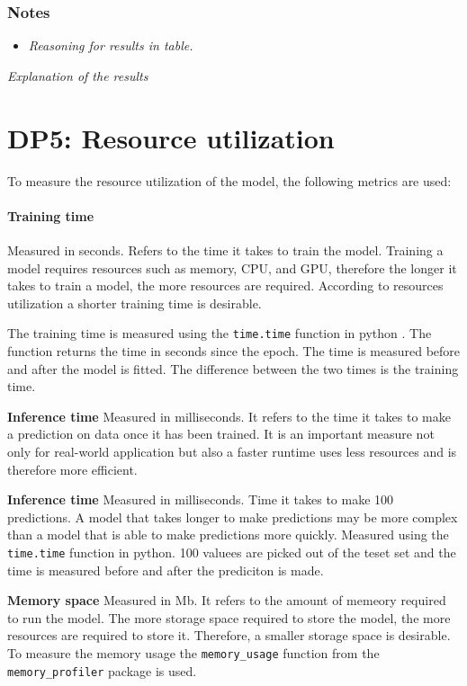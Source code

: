 \subsubsection*{Notes}
\begin{itemize}
    \item \textit{Reasoning for results in table.}
\end{itemize}

\textit{Explanation of the results}


\section{DP5: Resource utilization}\label{sec:resource-utilization}

To measure the resource utilization of the model, the following metrics are
used:

\paragraph*{Training time}
Measured in seconds. Refers to the time it takes to train the model.
Training a model requires resources such as memory, CPU, and GPU, therefore
the longer it takes
to train a model, the more resources are required. According to resources
utilization a shorter
training time is desirable.

The training time is measured using the \texttt{time.time} function in python
. The function
returns the time in seconds since the epoch. The time is measured before and
after the model is
fitted. The difference between the two times is the training time.

\textbf{Inference time}
Measured in milliseconds. It refers to the time it takes to make a prediction
on data once it has
been trained.
It is an important measure not only for real-world application but also a
faster runtime uses
less resources and is therefore more efficient.

\textbf{Inference time}
Measured in milliseconds. Time it takes to make 100 predictions.
A model that takes longer to make predictions may be more complex than a
model that is able to
make predictions more quickly.
Measured using the \texttt{time.time} function in python. 100 valuees are
picked out of the teset
set and the time is measured before and after the prediciton is made.

\textbf{Memory space}
Measured in Mb.
It refers to the amount of memeory required to run the model.
The more storage space required to store the model, the more resources are
required to store it.
Therefore, a smaller storage space is desirable.
To measure the memory usage the \texttt{memory\_usage} function from the
\texttt{memory\_profiler}
package is used.

